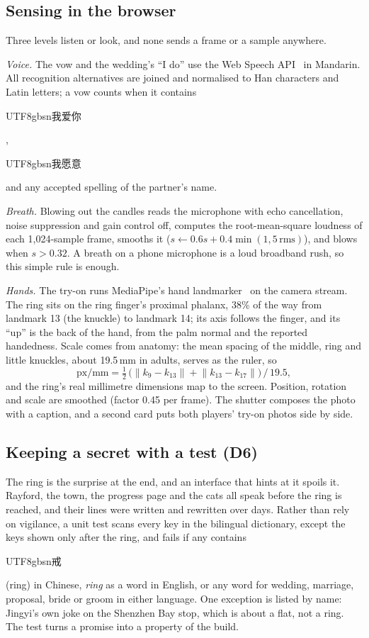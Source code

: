 \documentclass[sigconf,nonacm]{acmart}
\newcommand{\zh}[1]{\begin{CJK*}{UTF8}{gbsn}#1\end{CJK*}}
\newcommand{\dc}[1]{\textsc{D#1}}
\begin{document}
\subsection{Sensing in the browser}\label{sec:sensing}
Three levels listen or look, and none sends a frame or a sample anywhere.

\emph{Voice.} The vow and the wedding's ``I do'' use the Web Speech API~\cite{w3c2023speech} in
Mandarin. All recognition alternatives are joined and normalised to Han characters and Latin
letters; a vow counts when it contains \zh{我爱你}, \zh{我愿意} and any accepted spelling of the
partner's name.

\emph{Breath.} Blowing out the candles reads the microphone with echo cancellation, noise
suppression and gain control off, computes the root-mean-square loudness of each 1{,}024-sample
frame, smooths it ($s \leftarrow 0.6s + 0.4\min(1, 5\,\mathrm{rms})$), and blows when $s > 0.32$.
A breath on a phone microphone is a loud broadband rush, so this simple rule is enough.

\emph{Hands.} The try-on runs MediaPipe's hand landmarker~\cite{lugaresi2019mediapipe,zhang2020hands}
on the camera stream. The ring sits on the ring finger's proximal phalanx, 38\% of the way from
landmark 13 (the knuckle) to landmark 14; its axis follows the finger, and its ``up'' is the back of
the hand, from the palm normal and the reported handedness. Scale comes from anatomy: the mean
spacing of the middle, ring and little knuckles, about 19.5\,mm in adults, serves as the ruler, so
\begin{equation}
  \text{px/mm} = \tfrac{1}{2}\,\big(\lVert k_9 - k_{13}\rVert + \lVert k_{13} - k_{17}\rVert\big) \,/\, 19.5 ,
\end{equation}
and the ring's real millimetre dimensions map to the screen. Position, rotation and scale are
smoothed (factor 0.45 per frame). The shutter composes the photo with a caption, and a second card
puts both players' try-on photos side by side.

\subsection{Keeping a secret with a test (\dc{6})}
The ring is the surprise at the end, and an interface that hints at it spoils it. Rayford, the
town, the progress page and the cats all speak before the ring is reached, and their lines were
written and rewritten over days. Rather than rely on vigilance, a unit test scans every key in
the bilingual dictionary, except the keys shown only after the ring, and fails if any contains
\zh{戒} (ring) in Chinese, \emph{ring} as a word in English, or any word for wedding, marriage,
proposal, bride or groom in either language. One exception is listed by name: Jingyi's own joke on
the Shenzhen Bay stop, which is about a flat, not a ring. The test turns a promise into a property
of the build.
\end{document}
